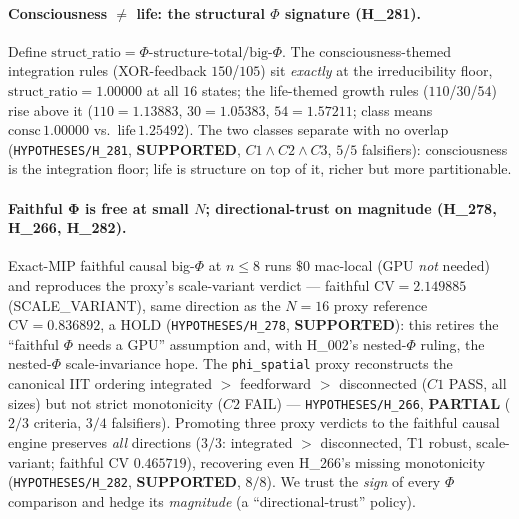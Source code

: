 \paragraph{Consciousness $\ne$ life: the structural $\Phi$ signature (H\_281).}
Define $\mathrm{struct\_ratio}=\Phi\text{-structure-total}/\text{big-}\Phi$. The
consciousness-themed integration rules (XOR-feedback $150$/$105$) sit \emph{exactly}
at the irreducibility floor, $\mathrm{struct\_ratio}=1.00000$ at all $16$ states;
the life-themed growth rules ($110$/$30$/$54$) rise above it
($110{=}1.13883$, $30{=}1.05383$, $54{=}1.57211$; class means
$\text{consc}\,1.00000$ vs.\ $\text{life}\,1.25492$). The two classes separate with
no overlap (\texttt{HYPOTHESES/H\_281}, \textbf{SUPPORTED}, $C1\wedge C2\wedge C3$,
$5/5$ falsifiers): consciousness is the integration floor; life is structure on top
of it, richer but more partitionable.

\paragraph{Faithful Φ is free at small $N$; directional-trust on magnitude (H\_278,
H\_266, H\_282).} Exact-MIP faithful causal big-$\Phi$ at $n{\le}8$ runs $\$0$
mac-local (GPU \emph{not} needed) and reproduces the proxy's scale-variant verdict ---
faithful $\mathrm{CV}=2.149885$ (SCALE\_VARIANT), same direction as the $N{=}16$ proxy
reference $\mathrm{CV}=0.836892$, a HOLD (\texttt{HYPOTHESES/H\_278}, \textbf{SUPPORTED}):
this retires the ``faithful $\Phi$ needs a GPU'' assumption and, with H\_002's
nested-$\Phi$ ruling, the nested-$\Phi$ scale-invariance hope. The \texttt{phi\_spatial}
proxy reconstructs the canonical IIT ordering integrated $>$ feedforward $>$ disconnected
($C1$ PASS, all sizes) but not strict monotonicity ($C2$ FAIL) ---
\texttt{HYPOTHESES/H\_266}, \textbf{PARTIAL} ($2/3$ criteria, $3/4$ falsifiers). Promoting
three proxy verdicts to the faithful causal engine preserves \emph{all} directions
($3/3$: integrated $>$ disconnected, T1 robust, scale-variant; faithful CV $0.465719$),
recovering even H\_266's missing monotonicity (\texttt{HYPOTHESES/H\_282}, \textbf{SUPPORTED},
$8/8$). We trust the \emph{sign} of every $\Phi$ comparison and hedge its \emph{magnitude}
(a ``directional-trust'' policy).

